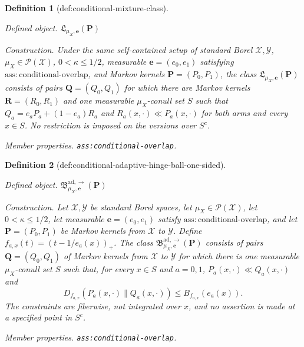 \documentclass{article}
\newtheorem{definition}{Definition}
\begin{document}
\begin{definition}[def:conditional-mixture-class]\label{def:conditional-mixture-class}
\par\smallskip\noindent\emph{Defined object.} \(\mathfrak L_{\mu_X,\boldsymbol e}(\boldsymbol P)\)
\par\smallskip\noindent\emph{Construction.} Under the same self-contained setup of standard Borel \(\mathcal X,\mathcal Y\), \(\mu_X\in\mathcal P(\mathcal X)\), \(0<\kappa\le1/2\), measurable \(\boldsymbol e=(e_0,e_1)\) satisfying \(\mathrm{ass:conditional\text{-}overlap}\), and Markov kernels \(\boldsymbol P=(P_0,P_1)\), the class \(\mathfrak L_{\mu_X,\boldsymbol e}(\boldsymbol P)\) consists of pairs \(\boldsymbol Q=(Q_0,Q_1)\) for which there are Markov kernels \(\boldsymbol R=(R_0,R_1)\) and one measurable \(\mu_X\)-conull set \(S\) such that \(Q_a=e_aP_a+(1-e_a)R_a\) and \(R_a(x,\cdot)\ll P_a(x,\cdot)\) for both arms and every \(x\in S\).  No restriction is imposed on the versions over \(S^c\).
\par\smallskip\noindent\emph{Member properties.} \texttt{ass:\allowbreak{}conditional-\allowbreak{}overlap}.
\end{definition}

\begin{definition}[def:conditional-adaptive-hinge-ball-one-sided]\label{def:conditional-adaptive-hinge-ball-one-sided}
\par\smallskip\noindent\emph{Defined object.} \(\mathfrak B^{\mathrm{ad},\to}_{\mu_X,\boldsymbol e}(\boldsymbol P)\)
\par\smallskip\noindent\emph{Construction.} Let \(\mathcal X,\mathcal Y\) be standard Borel spaces, let \(\mu_X\in\mathcal P(\mathcal X)\), let \(0<\kappa\le1/2\), let measurable \(\boldsymbol e=(e_0,e_1)\) satisfy \(\mathrm{ass:conditional\text{-}overlap}\), and let \(\boldsymbol P=(P_0,P_1)\) be Markov kernels from \(\mathcal X\) to \(\mathcal Y\).  Define \(f_{a,x}(t)=(t-1/e_a(x))_+\).  The class \(\mathfrak B^{\mathrm{ad},\to}_{\mu_X,\boldsymbol e}(\boldsymbol P)\) consists of pairs \(\boldsymbol Q=(Q_0,Q_1)\) of Markov kernels from \(\mathcal X\) to \(\mathcal Y\) for which there is one measurable \(\mu_X\)-conull set \(S\) such that, for every \(x\in S\) and \(a=0,1\), \(P_a(x,\cdot)\ll Q_a(x,\cdot)\) and
\[
 D_{f_{a,x}}(P_a(x,\cdot)\|Q_a(x,\cdot))\le B_{f_{a,x}}(e_a(x)).
\]
The constraints are fiberwise, not integrated over \(x\), and no assertion is made at a specified point in \(S^c\).
\par\smallskip\noindent\emph{Member properties.} \texttt{ass:\allowbreak{}conditional-\allowbreak{}overlap}.
\end{definition}
\end{document}
